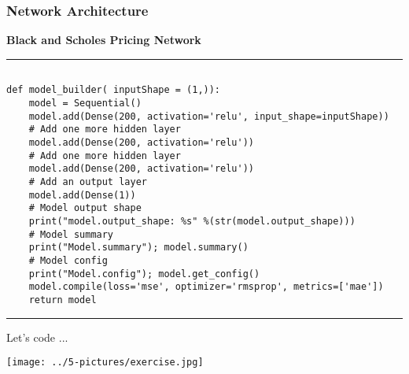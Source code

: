 \documentclass[11pt]{beamer}
\begin{document}
\begin{frame}[fragile]
\frametitle{Network Architecture}
\textbf{Black and Scholes Pricing Network}
\rule{\textwidth}{1pt}
\scriptsize
\begin{verbatim}

def model_builder( inputShape = (1,)):
    model = Sequential()
    model.add(Dense(200, activation='relu', input_shape=inputShape))
    # Add one more hidden layer 
    model.add(Dense(200, activation='relu'))
    # Add one more hidden layer 
    model.add(Dense(200, activation='relu'))
    # Add an output layer 
    model.add(Dense(1))
    # Model output shape
    print("model.output_shape: %s" %(str(model.output_shape)))
    # Model summary
    print("Model.summary"); model.summary()
    # Model config
    print("Model.config"); model.get_config()
    model.compile(loss='mse', optimizer='rmsprop', metrics=['mae'])
    return model

\end{verbatim}
\rule{\textwidth}{1pt}
\end{frame}
\begin{frame}{Let's code ...}
\begin{center}
\texttt{[image: ../5-pictures/exercise.jpg]} 
\end{center}
\end{frame}
\end{document}
